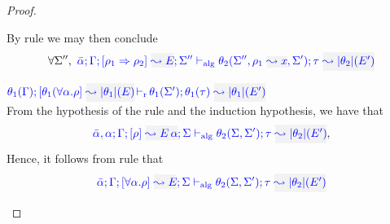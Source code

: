 \begin{proof}
\begin{description}
  By rule  we may then conclude
\begin{equation*}
\forall\Sigma'',~\admres{\bar\alpha}{\tenv}{\rulet_1\To\rulet_2}{E}{\Sigma''}{\type}{\etrans{\theta_2}(E')}{\theta_2(\Sigma'',\ie{\rulet_1}{x},\Sigma')}
\end{equation*} 

\item[\fbox{\rref{M-TApp}}]\quad
$\dmres{\theta_1(\tenv)}{\theta_1(\tall{\alpha}{\rulet}}{\etrans{\theta_1}(E)}{\theta_1(\type)}{\etrans{\theta_1}(E')}{\theta_1(\Sigma')}$\ \\

  From the hypothesis of the rule and the induction hypothesis, we have that
\begin{equation*}
  \admres{\bar\alpha,\alpha}{\tenv}{\rulet}{\mmapp{E}{\alpha}}{\Sigma}{\type}{\etrans{\theta_2}(E')}{\theta_2(\Sigma,\Sigma')}
,\end{equation*}
  Hence, it follows from rule  that
\begin{equation*}
\admres{\bar\alpha}{\tenv}{\tall{\alpha}{\rulet}}{E}{\Sigma}{\type}{\etrans{\theta_2}(E')}{\theta_2(\Sigma,\Sigma')}
\end{equation*}
\end{description}
\end{proof}

{\centering
{}}

